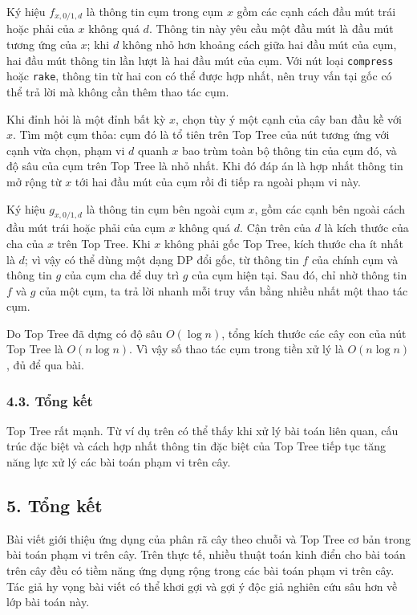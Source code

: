 \documentclass[11pt]{article}
\begin{document}
Ký hiệu \(f_{x,0/1,d}\) là thông tin cụm trong cụm \(x\) gồm các cạnh cách đầu
mút trái hoặc phải của \(x\) không quá \(d\). Thông tin này yêu cầu một đầu
mút là đầu mút tương ứng của \(x\); khi \(d\) không nhỏ hơn khoảng cách giữa
hai đầu mút của cụm, hai đầu mút thông tin lần lượt là hai đầu mút của cụm.
Với nút loại \texttt{compress} hoặc \texttt{rake}, thông tin từ hai con có thể
được hợp nhất, nên truy vấn tại gốc có thể trả lời mà không cần thêm thao tác
cụm.

Khi đỉnh hỏi là một đỉnh bất kỳ \(x\), chọn tùy ý một cạnh của cây ban đầu
kề với \(x\). Tìm một cụm thỏa: cụm đó là tổ tiên trên Top Tree của nút tương
ứng với cạnh vừa chọn, phạm vi \(d\) quanh \(x\) bao trùm toàn bộ thông tin của
cụm đó, và độ sâu của cụm trên Top Tree là nhỏ nhất. Khi đó đáp án là hợp nhất
thông tin mở rộng từ \(x\) tới hai đầu mút của cụm rồi đi tiếp ra ngoài phạm
vi này.

Ký hiệu \(g_{x,0/1,d}\) là thông tin cụm bên ngoài cụm \(x\), gồm các cạnh bên
ngoài cách đầu mút trái hoặc phải của cụm \(x\) không quá \(d\). Cận trên của
\(d\) là kích thước của cha của \(x\) trên Top Tree. Khi \(x\) không phải gốc
Top Tree, kích thước cha ít nhất là \(d\); vì vậy có thể dùng một dạng DP đổi
gốc, từ thông tin \(f\) của chính cụm và thông tin \(g\) của cụm cha để duy
trì \(g\) của cụm hiện tại. Sau đó, chỉ nhờ thông tin \(f\) và \(g\) của một
cụm, ta trả lời nhanh mỗi truy vấn bằng nhiều nhất một thao tác cụm.

Do Top Tree đã dựng có độ sâu \(O(\log n)\), tổng kích thước các cây con của
nút Top Tree là \(O(n\log n)\). Vì vậy số thao tác cụm trong tiền xử lý là
\(O(n\log n)\), đủ để qua bài.

\subsubsection*{4.3. Tổng kết}

Top Tree rất mạnh. Từ ví dụ trên có thể thấy khi xử lý bài toán liên quan,
cấu trúc đặc biệt và cách hợp nhất thông tin đặc biệt của Top Tree tiếp tục
tăng năng lực xử lý các bài toán phạm vi trên cây.

\subsection*{5. Tổng kết}

Bài viết giới thiệu ứng dụng của phân rã cây theo chuỗi và Top Tree cơ bản
trong bài toán phạm vi trên cây. Trên thực tế, nhiều thuật toán kinh điển cho
bài toán trên cây đều có tiềm năng ứng dụng rộng trong các bài toán phạm vi
trên cây. Tác giả hy vọng bài viết có thể khơi gợi và gợi ý độc giả nghiên
cứu sâu hơn về lớp bài toán này.
\end{document}
